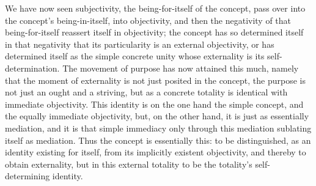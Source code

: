 We have now seen subjectivity,
the being-for-itself of the concept,
pass over into the concept's
being-in-itself, into objectivity,
and then the negativity of
that being-for-itself
reassert itself in objectivity;
the concept has so determined itself in that negativity
that its particularity is an external objectivity,
or has determined itself as the simple concrete unity
whose externality is its self-determination.
The movement of purpose has now attained this much,
namely that the moment of externality is
not just posited in the concept,
the purpose is not just an ought and a striving,
but as a concrete totality is
identical with immediate objectivity.
This identity is on the one hand the simple concept,
and the equally immediate objectivity,
but, on the other hand,
it is just as essentially mediation,
and it is that simple immediacy only
through this mediation sublating itself as mediation.
Thus the concept is essentially this:
to be distinguished, as an identity existing for itself,
from its implicitly existent objectivity,
and thereby to obtain externality,
but in this external totality to be
the totality's self-determining identity.

